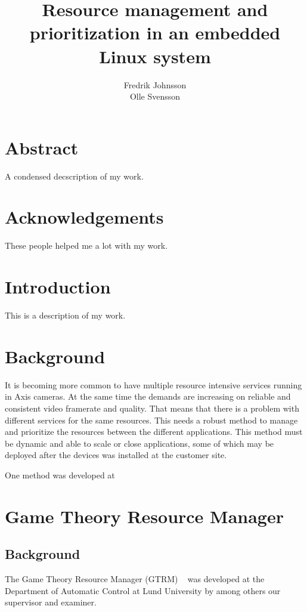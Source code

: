 \documentclass{LTHthesis}
\begin{document}
\begin{titlepages}
\author{Fredrik Johnsson\\Olle Svensson}
\title{Resource management and prioritization in an embedded Linux system}
\end{titlepages}
\setcounter{page}{1}
\chapter*{Abstract}
A condensed decscription of my work.
\chapter*{Acknowledgements}
These people helped me a lot with my work.
\newpage
\tableofcontents
\newpage
\setcounter{page}{1}
\chapter{Introduction}
This is a description of my work.
\chapter{Background}
It is becoming more common to have multiple resource intensive services running in Axis cameras. At the same time the demands are increasing on reliable and consistent video framerate and quality. That means that there is a problem with different services for the same resources. This needs a robust method to manage and prioritize the resources between the different applications. This method must be dynamic and able to scale or close applications, some of which may be deployed after the devices was installed at the customer site.

One method was developed at 
\chapter{Game Theory Resource Manager}
\section{Background} %
The Game Theory Resource Manager (GTRM) ~\cite{gtrm} was developed at the Department of Automatic Control at Lund University by among others our supervisor and examiner. 
\end{document}
